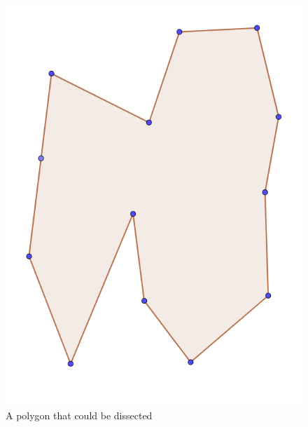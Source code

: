 \documentclass[12pt]{article}
\begin{document}
\begin{figure}[H]
    \includegraphics[width=\linewidth]{Images/intersection_polygon.png}
    \caption{A polygon that could be dissected}
    \label{fig:intersectionExamplePolygon}
    \endminipage\hfill

\end{figure}
\end{document}
